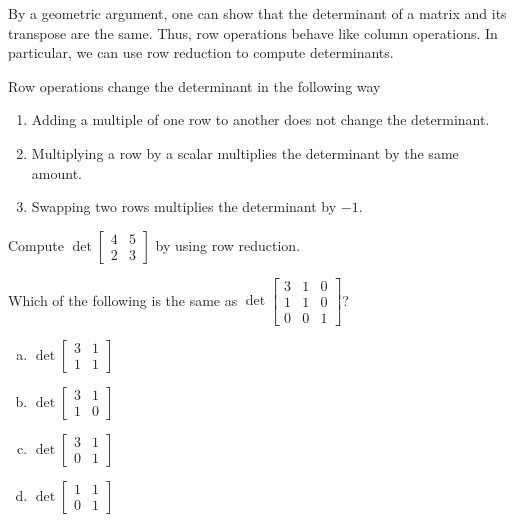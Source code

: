 
\begin{applicationActivities}{2}{26}

\begin{fact}
By a geometric argument, one can show that the determinant of a matrix and its transpose are the same.    Thus, row operations behave like column operations.  In particular, we can use row reduction to compute determinants.
\end{fact}

\begin{fact}
Row operations change the determinant in the following way
\begin{enumerate}
\item Adding a multiple of one row to another does not change the determinant.
\item Multiplying a row by a scalar multiplies the determinant by the same amount.
\item Swapping two rows multiplies the determinant by $-1$.
\end{enumerate}
\end{fact}

\begin{activity}{10}
  Compute $\det \begin{bmatrix} 4 & 5 \\ 2 & 3 \end{bmatrix}$ by using row reduction.
\end{activity}


\begin{activity}{10}
  Which of the following is the same as $\det \begin{bmatrix} 3 & 1 & 0 \\  1 & 1 & 0 \\  0 & 0 & 1\end{bmatrix}$?
\begin{multicols}{2}
\begin{enumerate}[(a)]
\item $\det \begin{bmatrix} 3 & 1 \\ 1 & 1 \end{bmatrix}$
\item $\det \begin{bmatrix} 3 & 1 \\ 1 & 0 \end{bmatrix}$
\item $\det \begin{bmatrix} 3 & 1 \\ 0 & 1 \end{bmatrix}$
\item $\det \begin{bmatrix} 1 & 1 \\ 0 & 1 \end{bmatrix}$
\end{enumerate}


\end{multicols}
\end{activity}
\end{applicationActivities}

